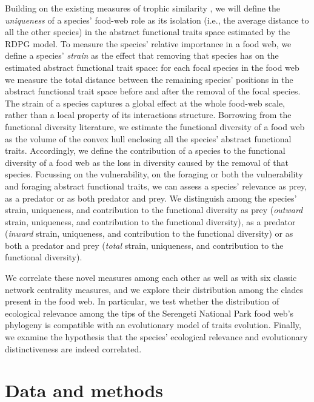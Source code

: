 \documentclass[]{rsos}%
\begin{document}
Building on the existing measures of trophic similarity
\citep{yodzis1999search,luczkovich2003defining,jordan2009trophic}, we will define
the \emph{uniqueness} of a species' food-web role  as its
isolation (i.e., the average distance to all the other species) in the abstract
functional traits space estimated by the RDPG model. To measure the 
species' relative importance in a food web, we define a species' \emph{strain} as the
effect that removing that species has on the estimated abstract functional
trait space: for each focal species in the food web we measure the total
distance between the remaining species' positions in the abstract functional
trait space before and after the removal of the focal species. The strain of a species
captures a global effect at the whole food-web scale, rather than a local property of its interactions structure.
Borrowing from the functional diversity literature, we estimate the functional diversity of a food web as the
volume of the convex hull enclosing all the species' abstract functional
traits. Accordingly, we define the contribution of a species to the functional
diversity of a food web as the loss in diversity caused by the removal of that
species.  Focussing on the vulnerability, on the foraging or both the
vulnerability and foraging abstract functional traits, we can assess a
species' relevance as prey, as a predator or as both predator and prey. We
distinguish among the species' strain, uniqueness, and contribution to the
functional diversity as prey (\emph{outward} strain, uniqueness, and contribution to
the functional diversity), as a predator (\emph{inward} strain, uniqueness,
and contribution to the functional diversity) or as both a predator and prey
(\emph{total} strain, uniqueness, and contribution to the functional diversity).

We correlate these novel measures among each other as well as with six classic
network centrality measures, and we explore their distribution among the clades
present in the food web. In particular, we test whether the distribution of
ecological relevance among the tips of the Serengeti National Park food web's
phylogeny is compatible with an evolutionary model of traits evolution.
Finally, we examine the hypothesis that the species' ecological relevance and
evolutionary distinctiveness are indeed correlated.



\section{Data and methods}
% 
\end{document}
